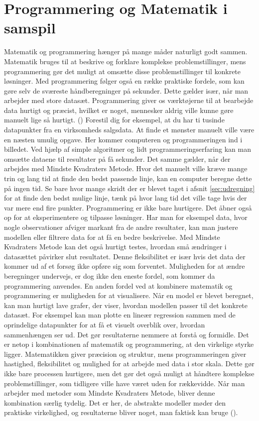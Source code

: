 \section{Programmering og Matematik i samspil}
Matematik og programmering hænger på mange måder naturligt godt sammen. Matematik bruges til at beskrive og forklare komplekse problemstillinger, mens programmering gør det muligt at omsætte disse problemstillinger til konkrete løsninger. Med programmering følger også en række praktiske fordele, som kan gøre selv de sværeste håndberegninger på sekunder. Dette gælder især, når man arbejder med store datasæt. Programmering giver os værktøjerne til at bearbejde data hurtigt og præcist, hvilket er noget, mennesker aldrig ville kunne gøre manuelt lige så hurtigt. (\cite{codeWithC}) Forestil dig for eksempel, at du har ti tusinde datapunkter fra en virksomheds salgsdata. At finde et mønster manuelt ville være en næsten umulig opgave. Her kommer computeren og programmeringen ind i billedet. Ved hjælp af simple algoritmer og lidt programmeringserfaring kan man omsætte dataene til resultater på få sekunder. Det samme gælder, når der arbejdes med Mindste Kvadraters Metode. Hvor det manuelt ville kræve mange trin og lang tid at finde den bedst passende linje, kan en computer beregne dette på ingen tid. Se bare hvor mange skridt der er blevet taget i afsnit \ref{sec:udregning} for at finde den bedst mulige linje, tænk på hvor lang tid det ville tage hvis der var mere end fire punkter. Programmering er ikke bare hurtigere. Det åbner også op for at eksperimentere og tilpasse løsninger. Har man for eksempel data, hvor nogle observationer afviger markant fra de andre resultater, kan man justere modellen eller filtrere data for at få en bedre beskrivelse. Med Mindste Kvadraters Metode kan det også hurtigt testes, hvordan små ændringer i datasættet påvirker slut resultatet. Denne fleksibilitet er især hvis det data der kommer ud af et forsøg ikke opføre sig som forventet. Muligheden for at ændre beregninger undervejs, er dog ikke den eneste fordel, som kommer da programmering anvendes. En anden fordel ved at kombinere matematik og programmering er muligheden for at visualisere. Når en model er blevet beregnet, kan man hurtigt lave grafer, der viser, hvordan modellen passer til det konkrete datasæt. For eksempel kan man plotte en lineær regression sammen med de oprindelige datapunkter for at få et visuelt overblik over, hvordan sammenhængen ser ud. Det gør resultaterne nemmere at forstå og formidle. Det er netop i kombinationen af matematik og programmering, at den virkelige styrke ligger. Matematikken giver præcision og struktur, mens programmeringen giver hastighed, fleksibilitet og mulighed for at arbejde med data i stor skala. Dette gør ikke bare processen hurtigere, men det gør det også muligt at håndtere komplekse problemstillinger, som tidligere ville have været uden for rækkevidde. Når man arbejder med metoder som Mindste Kvadraters Metode, bliver denne kombination særlig tydelig. Det er her, de abstrakte modeller møder den praktiske virkelighed, og resultaterne bliver noget, man faktisk kan bruge (\cite{geeksforgeeks}). \\

